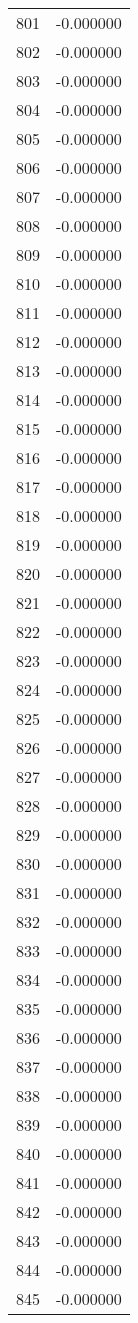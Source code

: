 \documentclass[12pt]{article}
\begin{document}
\begin{longtable}{@{}cc@{}}
801 & -0.000000 \\
802 & -0.000000 \\
803 & -0.000000 \\
804 & -0.000000 \\
805 & -0.000000 \\
806 & -0.000000 \\
807 & -0.000000 \\
808 & -0.000000 \\
809 & -0.000000 \\
810 & -0.000000 \\
811 & -0.000000 \\
812 & -0.000000 \\
813 & -0.000000 \\
814 & -0.000000 \\
815 & -0.000000 \\
816 & -0.000000 \\
817 & -0.000000 \\
818 & -0.000000 \\
819 & -0.000000 \\
820 & -0.000000 \\
821 & -0.000000 \\
822 & -0.000000 \\
823 & -0.000000 \\
824 & -0.000000 \\
825 & -0.000000 \\
826 & -0.000000 \\
827 & -0.000000 \\
828 & -0.000000 \\
829 & -0.000000 \\
830 & -0.000000 \\
831 & -0.000000 \\
832 & -0.000000 \\
833 & -0.000000 \\
834 & -0.000000 \\
835 & -0.000000 \\
836 & -0.000000 \\
837 & -0.000000 \\
838 & -0.000000 \\
839 & -0.000000 \\
840 & -0.000000 \\
841 & -0.000000 \\
842 & -0.000000 \\
843 & -0.000000 \\
844 & -0.000000 \\
845 & -0.000000 \\

\end{longtable}
\end{document}
